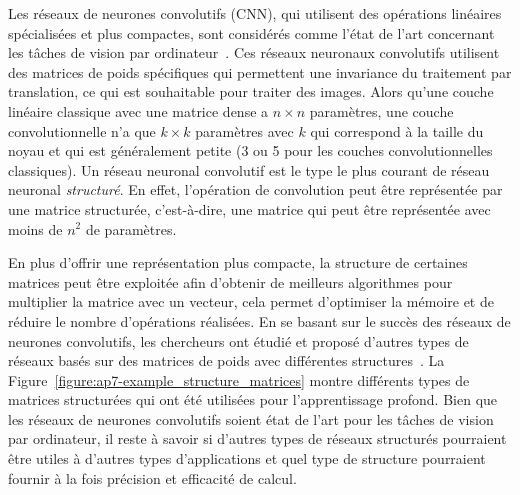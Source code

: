 Les réseaux de neurones convolutifs (CNN), qui utilisent des opérations linéaires spécialisées et plus compactes, sont considérés comme l'état de l'art concernant les tâches de vision par ordinateur~\cite{lecun1998gradient,krizhevsky2012imagenet,he2016deep,tan2019efficientnet}. 
Ces réseaux neuronaux convolutifs utilisent des matrices de poids spécifiques qui permettent une invariance du traitement par translation, ce qui est souhaitable pour traiter des images.
Alors qu'une couche linéaire classique avec une matrice dense a $n \times n$ paramètres, une couche convolutionnelle n'a que $k \times k$ paramètres avec $k$ qui correspond à la taille du noyau et qui est généralement petite (3 ou 5 pour les couches convolutionnelles classiques).
Un réseau neuronal convolutif est le type le plus courant de réseau neuronal \emph{structuré}.
En effet, l'opération de convolution peut être représentée par une matrice structurée, c'est-à-dire, une matrice qui peut être représentée avec moins de $n^2$ de paramètres.



En plus d'offrir une représentation plus compacte, la structure de certaines matrices peut être exploitée afin d'obtenir de meilleurs algorithmes pour multiplier la matrice avec un vecteur, cela permet d'optimiser la mémoire et de réduire le nombre d'opérations réalisées.
En se basant sur le succès des réseaux de neurones convolutifs, les chercheurs ont étudié et proposé d'autres types de réseaux basés sur des matrices de poids avec différentes structures~\cite{moczulski2016acdc,sindhwani2015structured}.
La Figure~\ref{figure:ap7-example_structure_matrices} montre différents types de matrices structurées qui ont été utilisées pour l'apprentissage profond.
Bien que les réseaux de neurones convolutifs soient état de l'art pour les tâches de vision par ordinateur, il reste à savoir si d'autres types de réseaux structurés pourraient être utiles à d'autres types d'applications et quel type de structure pourraient fournir à la fois précision et efficacité de calcul.


